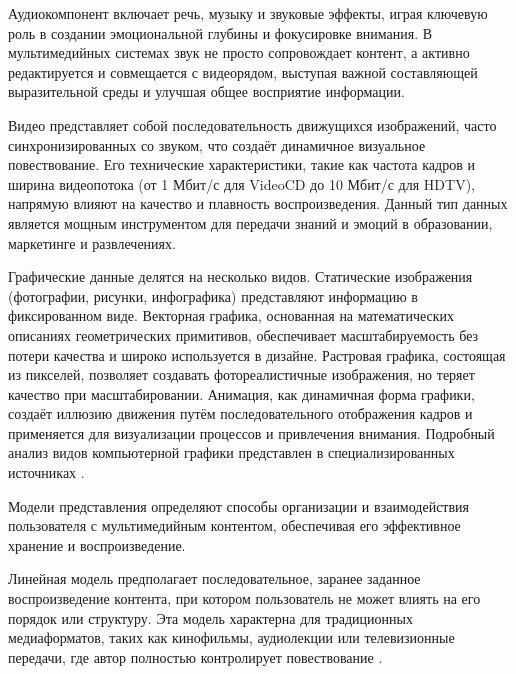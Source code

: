 \documentclass{SibFU-docs}
\begin{document}

Аудиокомпонент включает речь, музыку и звуковые эффекты, играя ключевую роль в создании эмоциональной глубины и фокусировке внимания. В мультимедийных системах звук не просто сопровождает контент, а активно редактируется и совмещается с видеорядом, выступая важной составляющей выразительной среды и улучшая общее восприятие информации.


Видео представляет собой последовательность движущихся изображений, часто синхронизированных со звуком, что создаёт динамичное визуальное повествование. Его технические характеристики, такие как частота кадров и ширина видеопотока (от 1 Мбит/с для VideoCD до 10 Мбит/с для HDTV), напрямую влияют на качество и плавность воспроизведения. Данный тип данных является мощным инструментом для передачи знаний и эмоций в образовании, маркетинге и развлечениях.


Графические данные делятся на несколько видов. Статические изображения (фотографии, рисунки, инфографика) представляют информацию в фиксированном виде. Векторная графика, основанная на математических описаниях геометрических примитивов, обеспечивает масштабируемость без потери качества и широко используется в дизайне. Растровая графика, состоящая из пикселей, позволяет создавать фотореалистичные изображения, но теряет качество при масштабировании. Анимация, как динамичная форма графики, создаёт иллюзию движения путём последовательного отображения кадров и применяется для визуализации процессов и привлечения внимания. Подробный анализ видов компьютерной графики представлен в специализированных источниках \cite{web20}.


Модели представления определяют способы организации и взаимодействия пользователя с мультимедийным контентом, обеспечивая его эффективное хранение и воспроизведение.


Линейная модель предполагает последовательное, заранее заданное воспроизведение контента, при котором пользователь не может влиять на его порядок или структуру. Эта модель характерна для традиционных медиаформатов, таких как кинофильмы, аудиолекции или телевизионные передачи, где автор полностью контролирует повествование \cite{web91}.
\end{document}
